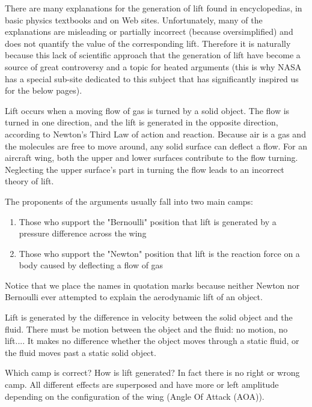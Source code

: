 	There are many explanations for the generation of lift found in encyclopedias, in basic physics textbooks and on Web sites. Unfortunately, many of the explanations are misleading or partially incorrect (because oversimplified) and does not quantify the value of the corresponding lift. Therefore it is naturally because this lack of scientific approach that the generation of lift have become a source of great controversy and a topic for heated arguments (this is why NASA has a special sub-site dedicated to this subject that has significantly inspired us for the below pages).

	Lift occurs when a moving flow of gas is turned by a solid object. The flow is turned in one direction, and the lift is generated in the opposite direction, according to Newton's Third Law of action and reaction. Because air is a gas and the molecules are free to move around, any solid surface can deflect a flow. For an aircraft wing, both the upper and lower surfaces contribute to the flow turning. Neglecting the upper surface's part in turning the flow leads to an incorrect theory of lift.
	
	The proponents of the arguments usually fall into two main camps: 
	\begin{enumerate}
		\item Those who support the "Bernoulli" position that lift is generated by a pressure difference across the wing

		\item Those who support the "Newton" position that lift is the reaction force on a body caused by deflecting a flow of gas
	\end{enumerate}
	Notice that we place the names in quotation marks because neither Newton nor Bernoulli ever attempted to explain the aerodynamic lift of an object. 
	
	Lift is generated by the difference in velocity between the solid object and the fluid. There must be motion between the object and the fluid: no motion, no lift.... It makes no difference whether the object moves through a static fluid, or the fluid moves past a static solid object. 
	
	Which camp is correct? How is lift generated? In fact there is no right or wrong camp. All different effects are superposed and have more or left amplitude depending on the configuration of the wing (Angle Of Attack (AOA)).

